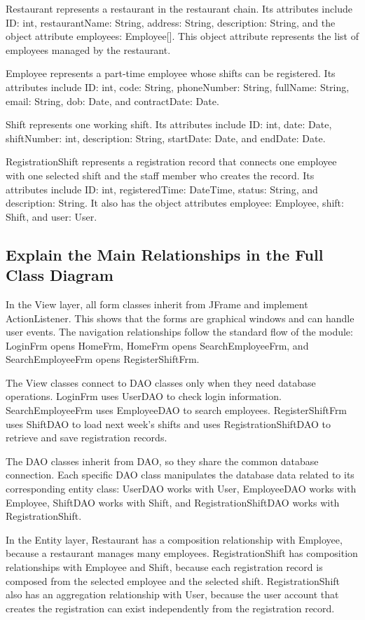 Restaurant represents a restaurant in the restaurant chain. Its attributes include ID: int, restaurantName: String, address: String, description: String, and the object attribute employees: Employee[]. This object attribute represents the list of employees managed by the restaurant.

Employee represents a part-time employee whose shifts can be registered. Its attributes include ID: int, code: String, phoneNumber: String, fullName: String, email: String, dob: Date, and contractDate: Date.

Shift represents one working shift. Its attributes include ID: int, date: Date, shiftNumber: int, description: String, startDate: Date, and endDate: Date.

RegistrationShift represents a registration record that connects one employee with one selected shift and the staff member who creates the record. Its attributes include ID: int, registeredTime: DateTime, status: String, and description: String. It also has the object attributes employee: Employee, shift: Shift, and user: User.

\subsection{Explain the Main Relationships in the Full Class Diagram}

In the View layer, all form classes inherit from JFrame and implement ActionListener. This shows that the forms are graphical windows and can handle user events. The navigation relationships follow the standard flow of the module: LoginFrm opens HomeFrm, HomeFrm opens SearchEmployeeFrm, and SearchEmployeeFrm opens RegisterShiftFrm.

The View classes connect to DAO classes only when they need database operations. LoginFrm uses UserDAO to check login information. SearchEmployeeFrm uses EmployeeDAO to search employees. RegisterShiftFrm uses ShiftDAO to load next week's shifts and uses RegistrationShiftDAO to retrieve and save registration records.

The DAO classes inherit from DAO, so they share the common database connection. Each specific DAO class manipulates the database data related to its corresponding entity class: UserDAO works with User, EmployeeDAO works with Employee, ShiftDAO works with Shift, and RegistrationShiftDAO works with RegistrationShift.

In the Entity layer, Restaurant has a composition relationship with Employee, because a restaurant manages many employees. RegistrationShift has composition relationships with Employee and Shift, because each registration record is composed from the selected employee and the selected shift. RegistrationShift also has an aggregation relationship with User, because the user account that creates the registration can exist independently from the registration record.


